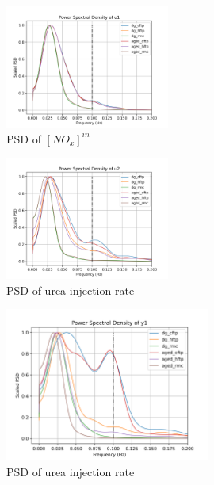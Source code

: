 \begin{multicols}{2}
       \begin{figure}[H]
        \centering
        \includegraphics[width=0.48\textwidth]{./figs/bfr_smth/test_psd/u1.png}
        \caption{PSD of $[NO_x]^{in}$ }
       \end{figure}

       \begin{figure}[H]
        \centering
        \includegraphics[width=0.48\textwidth]{./figs/bfr_smth/test_psd/u2.png}
        \caption{PSD of urea injection rate}
       \end{figure}
\end{multicols}

\begin{figure}[H]
\centering
\includegraphics[width=0.6\textwidth]{./figs/bfr_smth/test_psd/y1.png}
\caption{PSD of urea injection rate}
\end{figure}

